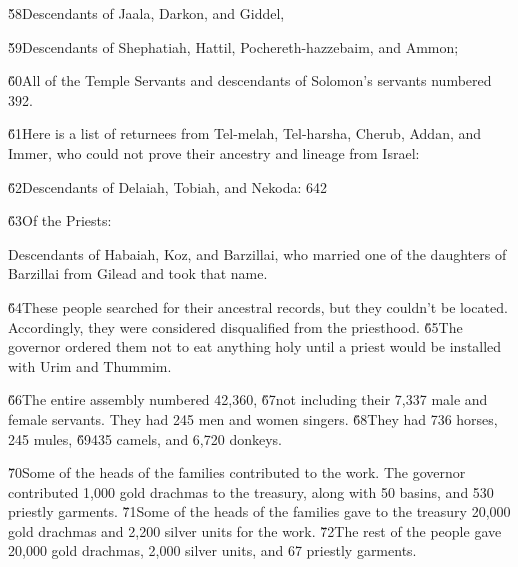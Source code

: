 \v{58}Descendants of Jaala, Darkon, and Giddel,

\v{59}Descendants of Shephatiah, Hattil, Pochereth-hazzebaim, and Ammon;

\v{60}All of the Temple Servants and descendants of Solomon's servants numbered 392.

\v{61}Here is a list of returnees from Tel-melah, Tel-harsha, Cherub, Addan, and Immer, who could not prove their ancestry and lineage from Israel:

\v{62}Descendants of Delaiah, Tobiah, and Nekoda: 642

\v{63}Of the Priests:

Descendants of Habaiah, Koz, and Barzillai, who married one of the daughters of Barzillai from Gilead and took that name.

\v{64}These people searched for their ancestral records, but they couldn't be located. Accordingly, they were considered disqualified from the priesthood. \v{65}The governor ordered them not to eat anything holy until a priest would be installed with Urim and Thummim.

\v{66}The entire assembly numbered 42,360, \v{67}not including their 7,337 male and female servants. They had 245 men and women singers. \v{68}They had 736 horses, 245 mules, \v{69}435 camels, and 6,720 donkeys.

\v{70}Some of the heads of the families contributed to the work. The governor contributed 1,000 gold drachmas to the treasury, along with 50 basins, and 530 priestly garments. \v{71}Some of the heads of the families gave to the treasury 20,000 gold drachmas and 2,200 silver units for the work. \v{72}The rest of the people gave 20,000 gold drachmas, 2,000 silver units, and 67 priestly garments.

